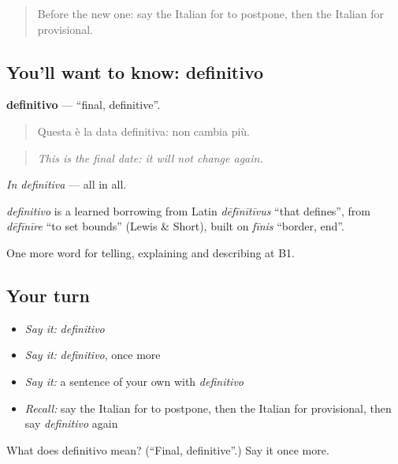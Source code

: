 \begin{quote}
Before the new one: say the Italian for to postpone, then the Italian for provisional.
\end{quote}

\subsection*{You'll want to know: definitivo}
\textbf{definitivo} — \textquotedblleft{}final, definitive\textquotedblright{}.

\begin{quote}
Questa è la data definitiva: non cambia più.
\end{quote}

\begin{quote}
\emph{This is the final date: it will not change again.}
\end{quote}

\emph{In definitiva} — all in all.

\begin{cousinweb}
\emph{definitivo} is a learned borrowing from Latin \emph{dēfīnītīvus} \textquotedblleft{}that defines\textquotedblright{}, from \emph{dēfīnīre} \textquotedblleft{}to set bounds\textquotedblright{} (Lewis \& Short), built on \emph{fīnis} \textquotedblleft{}border, end\textquotedblright{}.
\end{cousinweb}

\begin{grammarlens}[title={What you've built}]
One more word for telling, explaining and describing at B1.
\end{grammarlens}

\subsection*{Your turn}
\begin{itemize}
\raggedright
  \item \emph{Say it:} \emph{definitivo}
  \item \emph{Say it:} \emph{definitivo}, once more
  \item \emph{Say it:} a sentence of your own with \emph{definitivo}
  \item \emph{Recall:} say the Italian for to postpone, then the Italian for provisional, then say \emph{definitivo} again
\end{itemize}

\begin{tcolorbox}[breakable,colback=teal!4,colframe=teal!35!black,title={Before you move on}]
What does definitivo mean? (\textquotedblleft{}Final, definitive\textquotedblright{}.) Say it once more.
\end{tcolorbox}
